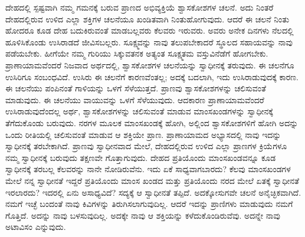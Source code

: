 \vskip 0.2cm

ದೇಹದಲ್ಲಿ ಸ್ಪಷ್ಟವಾಗಿ ನಮ್ಮ ಗಮನಕ್ಕೆ ಬರುವ ಪ್ರಾಣದ ಅಭಿವ್ಯಕ್ತಿಯೆ ಶ್ವಾಸಕೋಶಗಳ ಚಲನೆ. ಅದು ನಿಂತರೆ ದೇಹದಲ್ಲಿರುವ ಉಳಿದ ಎಲ್ಲಾ ಶಕ್ತಿಗಳ ಚಲನೆಯೂ ಖಂಡಿತವಾಗಿ ನಿಂತುಹೋಗುವುದು. ಆದರೆ ಈ ಚಲನೆ ನಿಂತು ಹೋದರೂ ಕೂಡ ದೇಹ ಬದುಕಿರುವಂತೆ ಮಾಡಬಲ್ಲವರು ಕೆಲವರು ಇರುವರು. ಅವರು ಅನೇಕ ದಿನಗಳು ನೆಲದಲ್ಲಿ ಹೂಳಿಸಿಕೊಂಡು ಉಸಿರಾಡದೆ ಜೀವಿಸಬಲ್ಲರು. ಸೂಕ್ಷ್ಮವನ್ನು ನಾವು ತಲುಪಬೇಕಾದರೆ ಸ್ಥೂಲದ ಸಹಾಯವನ್ನು ನಾವು ಪಡೆಯಬೇಕು. ಹೀಗೆಯೇ ನಮ್ಮ ಗುರಿಯು ಸಿಕ್ಕುವತನಕ ಅತ್ಯಂತ ಸೂಕ್ಷ್ಮತಮ ವಸ್ತುವಿನೆಡೆಗೆ ಹೋಗಬೇಕು. ಪ್ರಾಣಾಯಾಮವೆಂದರೆ ನಿಜವಾದ ಅರ್ಥದಲ್ಲಿ, ಶ್ವಾಸಕೋಶಗಳ ಚಲನೆಯನ್ನು ಸ್ವಾಧೀನಕ್ಕೆ ತರುವುದು. ಈ ಚಲನೆಗೂ ಉಸಿರಿಗೂ ಸಂಬಂಧವಿದೆ. ಉಸಿರು ಈ ಚಲನೆಗೆ ಕಾರಣವೆಂತಲ್ಲ; ಅದಕ್ಕೆ ಬದಲಾಗಿ, ಇದು ಉಸಿರಾಡುವುದಕ್ಕೆ ಕಾರಣ. ಈ ಚಲನೆಯು ಪಂಪಿನಂತೆ ಗಾಳಿಯನ್ನು ಒಳಗೆ ಸೆಳೆಯುತ್ತದೆ. ಪ್ರಾಣವು ಶ್ವಾಸಕೋಶಗಳನ್ನು ಚಲಿಸುವಂತೆ ಮಾಡುವುದು. ಈ ಚಲನೆಯು ವಾಯುವನ್ನು ಒಳಗೆ ಸೆಳೆಯುವುದು. ಆದಕಾರಣ ಪ್ರಾಣಾಯಾಮವೆಂದರೆ ಉಸಿರಾಡುವುದೆಂದಲ್ಲ ಅರ್ಥ, ಶ್ವಾಸಕೋಶಗಳನ್ನು ಚಲಿಸುವಂತೆ ಮಾಡುವ ಮಾಂಸಖಂಡಗಳನ್ನು ಸ್ವಾಧೀನಕ್ಕೆ ತೆಗೆದುಕೊಂಡು ಬರುವುದು. ನರಗಳ ಮೂಲಕ ಮಾಂಸಖಂಡಕ್ಕೆ ಹೋಗಿ, ಅಲ್ಲಿಂದ ಶ್ವಾಸಕೋಶಗಳಿಗೆ ಹೋಗಿ ಅದನ್ನು ಒಂದು ರೀತಿಯಲ್ಲಿ ಚಲಿಸುವಂತೆ ಮಾಡುವ ಆ ಶಕ್ತಿಯೇ ಪ್ರಾಣ. ಪ್ರಾಣಾಯಾಮದ ಅಭ್ಯಾಸದಲ್ಲಿ ನಾವು ಇದನ್ನು ಸ್ವಾಧೀನಕ್ಕೆ ತರಬೇಕಾಗಿದೆ. ಪ್ರಾಣವು ಸ್ವಾಧೀನವಾದ ಮೇಲೆ, ದೇಹದಲ್ಲಿರುವ ಉಳಿದ ಎಲ್ಲಾ ಪ್ರಾಣಗಳ ಕ್ರಿಯೆಗಳೂ ನಮ್ಮ ಸ್ವಾಧೀನಕ್ಕೆ ಬರುವುದು ತಕ್ಷಣವೇ ಗೊತ್ತಾಗುವುದು. ದೇಹದ ಪ್ರತಿಯೊಂದು ಮಾಂಸಖಂಡವನ್ನೂ ಕೂಡ ಸ್ವಾಧೀನಕ್ಕೆ ತರಬಲ್ಲ ಕೆಲವರನ್ನು ನಾನೇ ನೋಡಿರುವೆನು. ಇದು ಏಕೆ ಸಾಧ್ಯವಾಗಬಾರದು? ಕೆಲವು ಮಾಂಸಖಂಡಗಳ ಮೇಲೆ ನನ್ನ ಸ್ವಾಧೀನತೆ ಇದ್ದರೆ ಪ್ರತಿಯೊಂದು ಮಾಂಸ ಖಂಡದ ಮತ್ತು ಪ್ರತಿಯೊಂದು ನರದ ಮೇಲೆ ಏತಕ್ಕೆ ಸ್ವಾಧೀನತೆ ಇರಲಾರದು? ಇದರಲ್ಲಿ ಏನು ಅಸಾಧ್ಯವಿದೆ? ಸದ್ಯಕ್ಕೆ ಆ ಸ್ವಾಧೀನತೆ ತಪ್ಪಿದೆ. ಅದಕ್ಕೋಸುಗವೇ ಚಲನೆ ಅನೈಚ್ಛಿಕವಾಗಿದೆ. ನಮಗೆ ಇಚ್ಛೆ ಬಂದಂತೆ ನಾವು ಕಿವಿಗಳನ್ನು ತಿರುಗಿಸಲಾಗುವುದಿಲ್ಲ. ಆದರೆ ಇದನ್ನು ಪ್ರಾಣಿಗಳು ಮಾಡುವುದು ನಮಗೆ ಗೊತ್ತಿದೆ. ಅದನ್ನು ನಾವು ಬಳಸುವುದಿಲ್ಲ. ಅದಕ್ಕೇ ನಾವು ಆ ಶಕ್ತಿಯನ್ನು ಕಳೆದುಕೊಂಡಿರುವೆವು. ಅದನ್ನೇ ನಾವು ಅಟಾವಿಸಂ  ಎನ್ನುವುದು. 

\vskip 0.2cm

